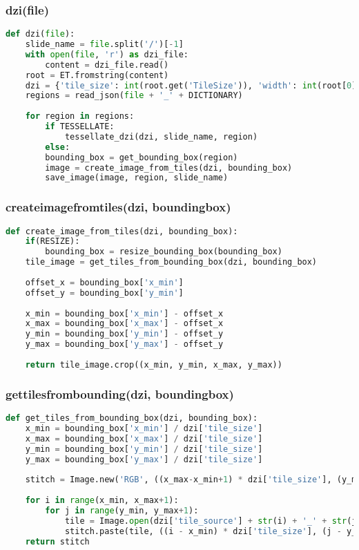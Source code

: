 \subsubsection{dzi(file)}

\begin{lstlisting}[frame=single,language=python]
def dzi(file):
	slide_name = file.split('/')[-1]
	with open(file, 'r') as dzi_file:
		content = dzi_file.read()
	root = ET.fromstring(content)
	dzi = {'tile_size': int(root.get('TileSize')), 'width': int(root[0].get('Width')), 'height': int(root[0].get('Height')), 'tile_source': get_tile_source(file), 'format': root.get('Format')}
	regions = read_json(file + '_' + DICTIONARY)
	
	for region in regions:
		if TESSELLATE:
			tessellate_dzi(dzi, slide_name, region)
		else:
		bounding_box = get_bounding_box(region)
		image = create_image_from_tiles(dzi, bounding_box)
		save_image(image, region, slide_name)
\end{lstlisting}


\subsubsection{create{\textunderscore}image{\textunderscore}from{\textunderscore}tiles(dzi, bounding{\textunderscore}box)}

\begin{lstlisting}[frame=single,language=python]
def create_image_from_tiles(dzi, bounding_box):
	if(RESIZE):
		bounding_box = resize_bounding_box(bounding_box)
	tile_image = get_tiles_from_bounding_box(dzi, bounding_box)
	
	offset_x = bounding_box['x_min']
	offset_y = bounding_box['y_min']
	
	x_min = bounding_box['x_min'] - offset_x
	x_max = bounding_box['x_max'] - offset_x
	y_min = bounding_box['y_min'] - offset_y
	y_max = bounding_box['y_max'] - offset_y
	
	return tile_image.crop((x_min, y_min, x_max, y_max))
\end{lstlisting}


\subsubsection{get{\textunderscore}tiles{\textunderscore}from{\textunderscore}bounding(dzi, bounding{\textunderscore}box)}

\begin{lstlisting}[frame=single,language=python]
def get_tiles_from_bounding_box(dzi, bounding_box):
	x_min = bounding_box['x_min'] / dzi['tile_size']
	x_max = bounding_box['x_max'] / dzi['tile_size']
	y_min = bounding_box['y_min'] / dzi['tile_size']
	y_max = bounding_box['y_max'] / dzi['tile_size']
	
	stitch = Image.new('RGB', ((x_max-x_min+1) * dzi['tile_size'], (y_max-y_min+1) * dzi['tile_size']))
	
	for i in range(x_min, x_max+1):
		for j in range(y_min, y_max+1):
			tile = Image.open(dzi['tile_source'] + str(i) + '_' + str(j) + '.' + dzi['format'])
			stitch.paste(tile, ((i - x_min) * dzi['tile_size'], (j - y_min) * dzi['tile_size']))
	return stitch
\end{lstlisting}


